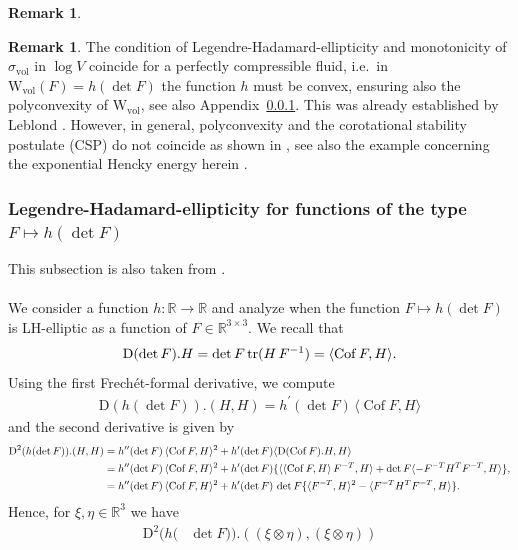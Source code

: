 \documentclass[10pt]{article}
\newcounter{theoremCounter}
\numberwithin{theoremCounter}{section}
\theoremstyle{plain}
\theoremstyle{definition}
\newtheorem{rem}[theoremCounter]{Remark}
\newcommand{\R}{\mathbb{R}}
\newcommand{\DD}{\mathrm{D}}
\newcommand{\WW}{\mathrm{W}}
\DeclareMathOperator{\Cof}{Cof}
\DeclareMathOperator{\tr}{tr}
\DeclareMathOperator{\vol}{vol}
\def\tr{\textnormal{tr}}
\numberwithin{equation}{section}
\begin{document}
\begin{appendix}
\begin{rem}
%
\end{rem}
%
\begin{rem}
The condition of Legendre-Hadamard-ellipticity and monotonicity of $\sigma_{\vol}$ in $\log V$ coincide for a perfectly compressible fluid, i.e.~in $\WW_{\vol}(F) = h(\det F)$ the function $h$ must be convex, ensuring also the polyconvexity \cite{Ball77} of $\WW_{\vol}$, see also Appendix~\ref{Appenhdet}. This was already established by Leblond \cite{leblond1992constitutive}. However, in general, polyconvexity and the corotational stability postulate (CSP) do not coincide as shown in \cite{NeffGhibaLankeit}, see also the example concerning the exponential Hencky energy herein \cite[Section 4]{NeffGhibaLankeit}.
\end{rem}
%
\subsubsection{Legendre-Hadamard-ellipticity for  functions of the type $F\mapsto h(\det F)$}
\label{Appenhdet}
%
This subsection is also taken from \cite{NeffGhibaLankeit}. \\
\\
We consider a function $h:\R\to\R$ and analyze when the function $F\mapsto h(\det F)$ is LH-elliptic as a function of $F\in \R^{3\times 3}$.  We recall that
	\begin{align}
	\DD(\det F).H=\det F\, \tr(H\, F^{-1})=\langle \Cof F,H\rangle.
	\end{align}
Using the first Frech\'{e}t-formal derivative, we compute
	\begin{align}
	\DD(h(\det F)).(H,H)=h^{\prime}(\det F)\, \langle \Cof F, H\rangle
	\end{align}
and the second derivative is given by
	\begin{align}
	\DD^2(h(\det F)).(H,H)&=h^{\prime\prime}(\det F)\, \langle \Cof F, H\rangle^2+h^{\prime}(\det F)\langle \DD(\Cof F).H, H\rangle\\
	&=h^{\prime\prime}(\det F)\, \langle \Cof F, H\rangle^2+h^{\prime}(\det F) \{\langle \langle \Cof F,H\rangle \, F^{-T},H\rangle+\det F\langle -F^{-T}H^T
	F^{-T},H\rangle\},\notag
	\\
	&=h^{\prime\prime}(\det F)\, \langle \Cof F, H\rangle^2+h^{\prime} (\det F)\, \det F \{\langle  F^{-T},H\rangle^2-\langle F^{-T}H^T
	F^{-T},H\rangle\}.\notag
	\end{align}
Hence, for $\xi,\eta\in \R^3$ we have
	\begin{align}
	\DD^2(h(&\det F)).((\xi\otimes\eta),(\xi\otimes\eta)) \\

\end{align}
\end{appendix}
\end{document}
